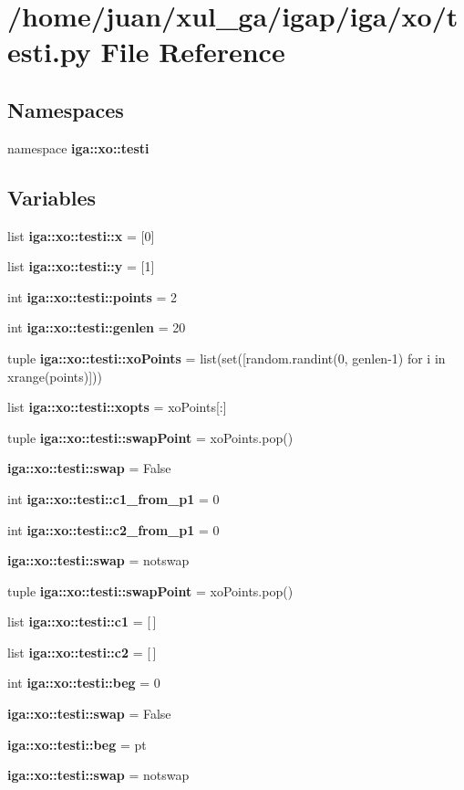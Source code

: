 \section{/home/juan/xul\_\-ga/igap/iga/xo/testi.py File Reference}
\label{iga_2xo_2testi_8py}
\subsection*{Namespaces}
\begin{CompactItemize}
\item 
namespace {\bf iga::xo::testi}
\end{CompactItemize}
\subsection*{Variables}
\begin{CompactItemize}
\item 
list {\bf iga::xo::testi::x} = [0]
\item 
list {\bf iga::xo::testi::y} = [1]
\item 
int {\bf iga::xo::testi::points} = 2
\item 
int {\bf iga::xo::testi::genlen} = 20
\item 
tuple {\bf iga::xo::testi::xoPoints} = list(set([random.randint(0, genlen-1) for i in xrange(points)]))
\item 
list {\bf iga::xo::testi::xopts} = xoPoints[:]
\item 
tuple {\bf iga::xo::testi::swapPoint} = xoPoints.pop()
\item 
{\bf iga::xo::testi::swap} = False
\item 
int {\bf iga::xo::testi::c1\_\-from\_\-p1} = 0
\item 
int {\bf iga::xo::testi::c2\_\-from\_\-p1} = 0
\item 
{\bf iga::xo::testi::swap} = notswap
\item 
tuple {\bf iga::xo::testi::swapPoint} = xoPoints.pop()
\item 
list {\bf iga::xo::testi::c1} = [$\,$]
\item 
list {\bf iga::xo::testi::c2} = [$\,$]
\item 
int {\bf iga::xo::testi::beg} = 0
\item 
{\bf iga::xo::testi::swap} = False
\item 
{\bf iga::xo::testi::beg} = pt
\item 
{\bf iga::xo::testi::swap} = notswap
\end{CompactItemize}
